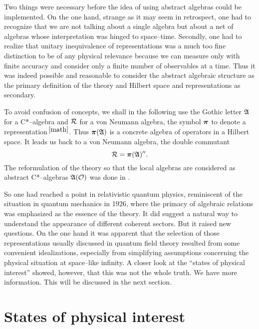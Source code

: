Two things were necessary
before the idea of using abstract algebras could be implemented. On
the one hand, strange as it may seem in retrospect, one had to
recognize that we are not talking about a single algebra but about a
net of algebras 
whose interpretation was hinged to space--time. Secondly, one had to
realize that unitary inequivalence of representations was a much too
fine distinction to be of any physical relevance because we can
measure only with finite accuracy and consider only a finite number of
observables at a time. Thus it was indeed possible and reasonable to
consider the abstract algebraic structure as the primary definition of
the theory and Hilbert space and representations as secondary. 

To avoid confusion of concepts, we shall in the following use the Gothic
letter ${\mathfrak A}$ for a C*--algebra and $\cal R$ for a von
Neumann algebra, the symbol $\mbox{{\boldmath $\pi$}}$ to
denote a representation$^{\, {\ref{math}}}$. Thus $\mbox{{\boldmath $\pi$}} ({\mathfrak A} )$ is a 
concrete algebra of operators in a Hilbert space. 
It leads us back to a von Neumann algebra, the double commutant
\begin{equation}
\cal R = \mbox{{\boldmath $\pi$}} ({\mathfrak A})^{\prime \prime}.
\end{equation}
The reformulation of the theory so that the local algebras 
are considered as abstract C*--algebras ${\mathfrak A} ({\cal O})$ 
was done in \cite{HaKa}. 

So one had reached a point in relativistic quantum physics, reminiscent
of the situation in quantum mechanics in 1926, where the primacy of
algebraic relations was emphasized as the essence of the
theory. It did suggest a natural way to understand the appearance 
of different coherent sectors. But it raised new questions. On the one hand
it was apparent that the selection of those representations usually
discussed in quantum field theory resulted from some convenient
idealizations, especially from simplifying assumptions concerning the
physical situation at space--like infinity. A closer look at the
``states of physical interest'' showed, however, that this was not the
whole truth. We have more information. 
This will be discussed in the next section.

\section{States of physical interest}
\setcounter{equation}{0}

